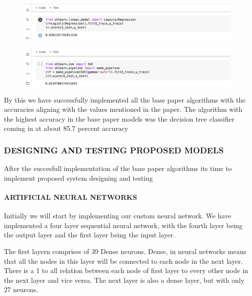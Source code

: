 \documentclass[12pt]{article}
\newcommand{\nd}{\noindent}
\begin{document}
\hspace{-5mm}
\begin{figure}[h]
\centering
\begin{minipage}{.5\textwidth}
  \centering
  \includegraphics[width=1.4\linewidth]{lr.png}
  \label{fig:test1}
\end{minipage}%
\begin{minipage}{.5\textwidth}
  \centering
  \includegraphics[width=1.4\linewidth]{sv.png}
  \label{fig:test2}
\end{minipage}
\end{figure}

\nd By this we have successfully implemented all the base paper algorithms with the accuracies aligning with the values mentioned in the paper. The algorithm with the highest accuracy in the base paper models was the decision tree classifier coming in at about 85.7 percent accuracy 

\newpage 
\subsubsection{\textbf{DESIGNING AND TESTING PROPOSED MODELS}}
After the succesfull implementation of the base paper algorithms its time to implement proposed system designing and testing 
\paragraph{ARTIFICIAL NEURAL NETWORKS}

Initially we will start by implementing our custom neural network. We have implemented a four layer sequential neural network, with the fourth layer being the output layer and the first layer being the input layer. 

\nd The first layern comprises of 39 Dense neurons. Dense, in neural networks means that all the nodes in this layer will be connected to each node in the next layer. There is a 1 to all relation between each node of first layer to every other node in the next layer and vice versa. The next layer is also a dense layer, but with only 27 neurons. 
\end{document}
